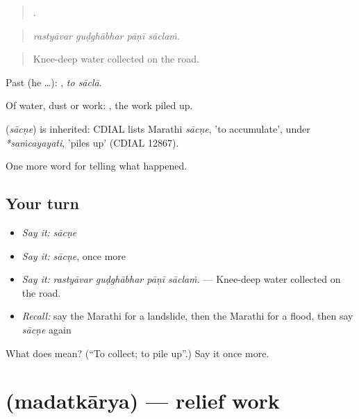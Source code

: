 \begin{quote}
   .
\end{quote}

\begin{quote}
\emph{rastyāvar guḍghābhar pāṇī sāclaṁ.}
\end{quote}

\begin{quote}
Knee-deep water collected on the road.
\end{quote}

Past (he …):  , \emph{to sāclā}.

Of water, dust or work:  , the work piled up.

\begin{cousinweb}
\textbf{} (\emph{sācṇe}) is inherited: CDIAL lists Marathi \emph{sācṇe}, 'to accumulate', under \emph{*saṁcayayati}, 'piles up' (CDIAL 12867).
\end{cousinweb}

\begin{grammarlens}[title={What you've built}]
One more word for telling what happened.
\end{grammarlens}

\subsection*{Your turn}
\begin{itemize}
\raggedright
  \item \emph{Say it:} \emph{sācṇe}
  \item \emph{Say it:} \emph{sācṇe}, once more
  \item \emph{Say it:} \emph{rastyāvar guḍghābhar pāṇī sāclaṁ.} — Knee-deep water collected on the road.
  \item \emph{Recall:} say the Marathi for a landslide, then the Marathi for a flood, then say \emph{sācṇe} again
\end{itemize}

\begin{tcolorbox}[breakable,colback=teal!4,colframe=teal!35!black,title={Before you move on}]
What does  mean? (\textquotedblleft{}To collect; to pile up\textquotedblright{}.) Say it once more.
\end{tcolorbox}
\section[\texorpdfstring{\mr{मदतकार्य} (madatkārya)}{मदतकार्य (madatkārya)}]{ (madatkārya) — relief work}

